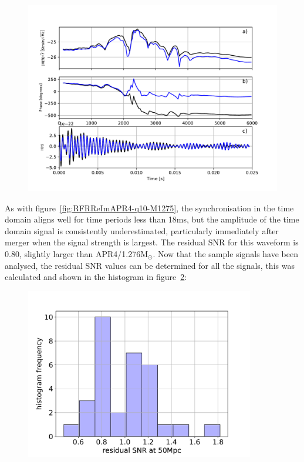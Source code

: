 \begin{figure}[H]
	\includegraphics[width=15cm]{./img/RFRReImALF2-q10-M1225.pdf} 
	\caption[\protect]{\protect}
	\label{fig:RFRReImALF2-q10-M1225}
\end{figure}
As with figure~\ref{fig:RFRReImAPR4-q10-M1275}, the synchronisation in the time domain aligns well for time periods less than 18ms, but the amplitude of the time domain signal is consistently underestimated, particularly immediately after merger when the signal strength is largest. The residual SNR for this waveform is 0.80, slightly larger than APR4/1.276M$_\odot$. Now that the sample signals have been analysed, the residual SNR values can be determined for all the signals, this was calculated and shown in the  histogram in figure~\ref{fig:RFRReImHist}:
\begin{figure}[H]
	\centering
	\includegraphics[width=10cm]{./img/RFRReImHist.pdf} 
	\caption[\protect]{\protect}
	\label{fig:RFRReImHist}
\end{figure}
